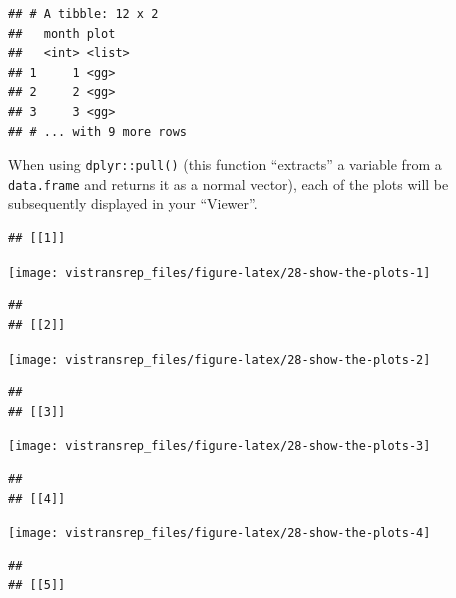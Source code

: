 \documentclass[]{book}
\newenvironment{Shaded}{}{}
\newcommand{\KeywordTok}[1]{\textcolor[rgb]{0.00,0.00,1.00}{#1}}
\newcommand{\NormalTok}[1]{#1}
\newcommand{\OperatorTok}[1]{#1}
\newcommand{\StringTok}[1]{\textcolor[rgb]{0.00,0.50,0.50}{#1}}
\begin{document}
\begin{verbatim}
## # A tibble: 12 x 2
##   month plot  
##   <int> <list>
## 1     1 <gg>  
## 2     2 <gg>  
## 3     3 <gg>  
## # ... with 9 more rows
\end{verbatim}

When using \texttt{dplyr::pull()} (this function ``extracts'' a variable from a \texttt{data.frame} and returns it as a normal vector), each of the plots will be subsequently displayed in your ``Viewer''.

\begin{Shaded}
\end{Shaded}

\begin{verbatim}
## [[1]]
\end{verbatim}

\begin{flushright}\texttt{[image: vistransrep\_files/figure-latex/28-show-the-plots-1]} \end{flushright}

\begin{verbatim}
## 
## [[2]]
\end{verbatim}

\begin{flushright}\texttt{[image: vistransrep\_files/figure-latex/28-show-the-plots-2]} \end{flushright}

\begin{verbatim}
## 
## [[3]]
\end{verbatim}

\begin{flushright}\texttt{[image: vistransrep\_files/figure-latex/28-show-the-plots-3]} \end{flushright}

\begin{verbatim}
## 
## [[4]]
\end{verbatim}

\begin{flushright}\texttt{[image: vistransrep\_files/figure-latex/28-show-the-plots-4]} \end{flushright}

\begin{verbatim}
## 
## [[5]]
\end{verbatim}
\end{document}
